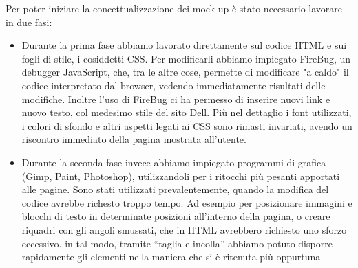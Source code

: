 \newline
Per poter iniziare la concettualizzazione dei mock-up è stato necessario lavorare in due fasi:
\begin{itemize}
\item Durante la prima fase abbiamo lavorato direttamente sul codice HTML e sui fogli di stile, i cosiddetti CSS. Per modificarli abbiamo impiegato FireBug, un debugger JavaScript, che, tra le altre cose, permette di modificare "a caldo" il codice interpretato dal browser, vedendo immediatamente risultati delle modifiche. Inoltre l'uso di FireBug ci ha permesso di inserire nuovi link e nuovo testo, col medesimo stile del sito Dell. Più nel dettaglio i font utilizzati, i colori di sfondo e altri aspetti legati ai CSS sono rimasti invariati, avendo un riscontro immediato della pagina mostrata all'utente.
\item Durante la seconda fase invece abbiamo impiegato programmi di grafica (Gimp, Paint, Photoshop), utilizzandoli per i ritocchi più pesanti apportati alle pagine. Sono stati utilizzati prevalentemente, quando la modifica del codice avrebbe richesto troppo tempo. Ad esempio per posizionare immagini e blocchi di testo in determinate posizioni all'interno della pagina, o creare riquadri con gli angoli smussati, che in HTML avrebbero richiesto uno sforzo eccessivo. in tal modo, tramite ``taglia e incolla'' abbiamo potuto disporre rapidamente gli elementi nella maniera che si è ritenuta più oppurtuna
\end{itemize}

